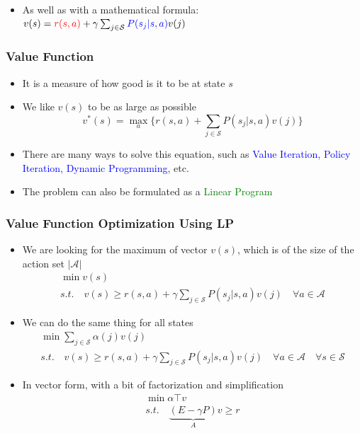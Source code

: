 \documentclass[aspectratio=169]{beamer}
\begin{document}
\begin{frame}
\begin{itemize}
\begin{itemize}
\begin{columns}
				\end{columns}
				\item As well as with a mathematical formula: $v(s) = \textcolor{red}{r(s,a)}+ \gamma \sum_{j \in \mathcal{S}} \textcolor{blue} {P(s_j | s,a)} v(j) $
			\end{itemize}

	\end{itemize}
\end{frame}

\begin{frame}
	\frametitle{Value Function}
	\begin{itemize}
		\item It is a measure of how good is it to be at state $s$
		\item We like $v(s)$ to be as large as possible
		\[
			v^*(s) = \max_{a} \{r(s,a) + \sum_{j \in \mathcal{S}} {P(s_j | s,a)} v(j)\}
		\]
		\item There are many ways to solve this equation, such as \textcolor{blue}{Value Iteration, Policy Iteration, Dynamic Programming}, etc.
		\item The problem can also be formulated as a \textcolor{green}{Linear Program}
	\end{itemize}
\end{frame}

\begin{frame}
	\frametitle{Value Function Optimization Using LP}
	\begin{itemize}
		\item We are looking for the maximum of vector $v(s)$, which is of the size of the action set $|\mathcal{A}|$
		\[
			\begin{matrix}
				\min v(s) \\
				s.t. \quad v(s) \geq r(s,a) + \gamma \sum_{j \in \mathcal{S}} {P(s_j | s,a)} v(j) \quad \forall a \in \mathcal{A}
			\end{matrix}	
		\]
		\item We can do the same thing for all states
		\[
			\begin{matrix}
				\min \sum_{j \in \mathcal{S}} \alpha(j)v(j) \\
				s.t. \quad v(s) \geq r(s,a) + \gamma \sum_{j \in \mathcal{S}} {P(s_j | s,a)} v(j) \quad \forall a \in \mathcal{A} \quad \forall s \in \mathcal{S}
			\end{matrix}	
		\]
		\item In vector form, with a bit of factorization and simplification
		\[
			\begin{matrix}
				\min \alpha\top v \\
				s.t. \quad \underbrace{(E - \gamma P)}_{A} v \geq r
			\end{matrix}	
		\]		
	\end{itemize}
\end{frame}
\end{document}
